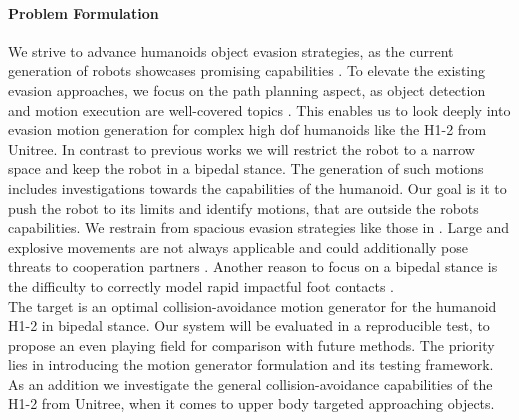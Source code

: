 \paragraph{Problem Formulation} \label{sec:introduction:problem}
We strive to advance humanoids object evasion strategies, as the current generation of robots showcases promising capabilities \cite{sun_2026,ren_2026}.
To elevate the existing evasion approaches, we focus on the path planning aspect, as object detection and motion execution are well-covered topics \cite{gad_2022,gu_2026}.
This enables us to look deeply into evasion motion generation for complex high \acrshort{dof} humanoids like the H1-2 from Unitree.
In contrast to previous works we will restrict the robot to a narrow space and keep the robot in a bipedal stance.
The generation of such motions includes investigations towards the capabilities of the humanoid.
Our goal is it to push the robot to its limits and identify motions, that are outside the robots capabilities.
We restrain from spacious evasion strategies like those in \cite{yang_2026,kohlbrenner_2026,zhao_2026}.
Large and explosive movements are not always applicable and could additionally pose threats to cooperation partners \cite{huang_2022}.
Another reason to focus on a bipedal stance is the difficulty to correctly model rapid impactful foot contacts \cite{wang_2023}.
\\
The target is an optimal collision-avoidance motion generator for the humanoid H1-2 in bipedal stance.
Our system will be evaluated in a reproducible test, to propose an even playing field for comparison with future methods.
The priority lies in introducing the motion generator formulation and its testing framework.
As an addition we investigate the general collision-avoidance capabilities of the H1-2 from Unitree, when it comes to upper body targeted approaching objects.

